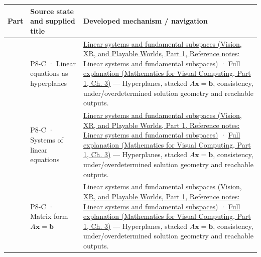 {\def\LTcaptype{none} %
\begin{longtable}[]{@{}
  >{\raggedright\arraybackslash}p{}
  >{\raggedright\arraybackslash}p{}
  >{\raggedright\arraybackslash}p{}@{}}
\toprule\noalign{}
\begin{minipage}[b]{\linewidth}\raggedright
Part
\end{minipage} & \begin{minipage}[b]{\linewidth}\raggedright
Source state and supplied title
\end{minipage} & \begin{minipage}[b]{\linewidth}\raggedright
Developed mechanism / navigation
\end{minipage} \\
\midrule\noalign{}
\endhead
\bottomrule\noalign{}
\endlastfoot
701 & P8-C · Linear equations as hyperplanes & \href{../07-Vision-XR-and-Playable-Worlds-P01/main.pdf\#appendix-8572a4a060c1}{Linear systems and fundamental subspaces (Vision, XR, and Playable Worlds, Part 1, Reference notes: Linear systems and fundamental subspaces)} · \href{../02-Mathematics-for-Visual-Computing-P01/main.pdf\#01-foundations-i-ch019-a-system-is-an-intersection-of-constraints}{Full explanation (Mathematics for Visual Computing, Part 1, Ch. 3)} --- Hyperplanes, stacked \(A\mathbf x=\mathbf b\), consistency, under/overdetermined solution geometry and reachable outputs. \\
702 & P8-C · Systems of linear equations & \href{../07-Vision-XR-and-Playable-Worlds-P01/main.pdf\#appendix-8572a4a060c1}{Linear systems and fundamental subspaces (Vision, XR, and Playable Worlds, Part 1, Reference notes: Linear systems and fundamental subspaces)} · \href{../02-Mathematics-for-Visual-Computing-P01/main.pdf\#01-foundations-i-ch019-a-system-is-an-intersection-of-constraints}{Full explanation (Mathematics for Visual Computing, Part 1, Ch. 3)} --- Hyperplanes, stacked \(A\mathbf x=\mathbf b\), consistency, under/overdetermined solution geometry and reachable outputs. \\
703 & P8-C · Matrix form \(A\mathbf x=\mathbf b\) & \href{../07-Vision-XR-and-Playable-Worlds-P01/main.pdf\#appendix-8572a4a060c1}{Linear systems and fundamental subspaces (Vision, XR, and Playable Worlds, Part 1, Reference notes: Linear systems and fundamental subspaces)} · \href{../02-Mathematics-for-Visual-Computing-P01/main.pdf\#01-foundations-i-ch019-a-system-is-an-intersection-of-constraints}{Full explanation (Mathematics for Visual Computing, Part 1, Ch. 3)} --- Hyperplanes, stacked \(A\mathbf x=\mathbf b\), consistency, under/overdetermined solution geometry and reachable outputs. \\

\end{longtable}}
